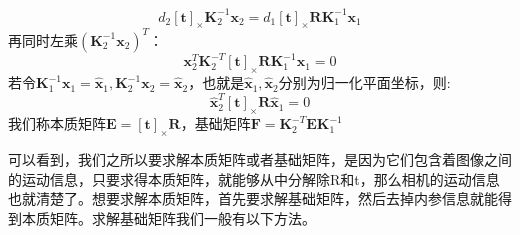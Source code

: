 \begin{equation}
d_{2} \left[\boldsymbol{t}\right]_{\times}\boldsymbol{K}_{2}^{-1} \boldsymbol{x}_{2}=d_{1}\left[\boldsymbol{t}\right]_{\times}\boldsymbol{R} \boldsymbol{K}_{1}^{-1} \boldsymbol{x}_{1}
\end{equation}
再同时左乘$\left(\boldsymbol{K}_{2}^{-1} \boldsymbol{x}_{2}\right)^T$：
\begin{equation}
\boldsymbol{x}_{2}^T\boldsymbol{K}_{2}^{-T} \left[\boldsymbol{t}\right]_{\times}\boldsymbol{R} \boldsymbol{K}_{1}^{-1} \boldsymbol{x}_{1}=0
\end{equation}
若令$\boldsymbol{K}_{1}^{-1} \boldsymbol{x}_{1}=\hat{\boldsymbol{x}}_1,\boldsymbol{K}_{2}^{-1} \boldsymbol{x}_{2}=\hat{\boldsymbol{x}}_2$，也就是$\hat{\boldsymbol{x}}_1,\hat{\boldsymbol{x}}_2$分别为归一化平面坐标，则:
\begin{equation}
\hat{\boldsymbol{x}}_2^T\left[\boldsymbol{t}\right]_{\times}\boldsymbol{R}\hat{\boldsymbol{x}}_1=0
\end{equation}
我们称本质矩阵$\boldsymbol{E}=[\boldsymbol{t}]_{\times} \boldsymbol{R}$，基础矩阵$\boldsymbol{F}=\boldsymbol{K}_{2}^{-T} \boldsymbol{E} \boldsymbol{K}_{1}^{-1}$\par
可以看到，我们之所以要求解本质矩阵或者基础矩阵，是因为它们包含着图像之间的运动信息，只要求得本质矩阵，就能够从中分解除R和t，那么相机的运动信息也就清楚了。想要求解本质矩阵，首先要求解基础矩阵，然后去掉内参信息就能得到本质矩阵。求解基础矩阵我们一般有以下方法。
